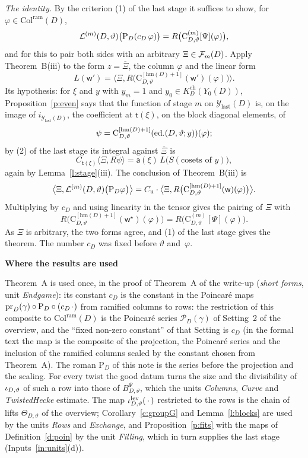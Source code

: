 \documentclass[11pt,a4paper]{article}
\makeatletter
\newcommand{\m}[1]{\mbox{$#1$}}        %
\newcommand{\sect}[2]{\refstepcounter{section}\label{#2}\par\addvspace{19pt plus 4pt minus 2pt}\Needspace{7\baselineskip}%
  \noindent\llap{{\fontsize{13.2}{16}\selectfont\bfseries\color{inkfaint}\thesection}\hspace{9pt}}%
  {\fontsize{13.2}{16}\selectfont\bfseries\color{ink}#1}\par\nopagebreak\vspace{-1pt}}
\theoremstyle{plainx}
\theoremstyle{uprightx}
\renewenvironment{proof}[1][Proof]{\par\pushQED{\qed}\normalfont\topsep0pt\partopsep0pt
  \trivlist\item[\hskip\labelsep\itshape #1.]\ignorespaces}{\popQED\endtrivlist\@endpefalse}
\newcommand{\cj}[1]{\overline{#1}}
\newcommand{\rhoD}[1]{\mathrm{hm}(#1)}                 %
\newcommand{\Ys}[2]{Y_{#2}(#1)}                    %
\newcommand{\Colram}[1]{\mathrm{Col}^{\mathrm{ram}}(#1)}
\newcommand{\PoinD}[1]{\mathrm{P}_{#1}}            %
\newcommand{\Bmu}[3]{B^{#3}_{#1,#2}}               %
\newcommand{\Kch}[2]{K^{\mathrm{ch}}_{#1}(#2)}     %
\newcommand{\chnn}[4]{\mathrm{C}^{[#4]}_{#1,#2}(#3)}       %
\newcommand{\chcomb}[4]{\mathrm{C}^{(#4)}_{#1,#2}[#3]}     %
\newcommand{\gYlast}{\mathcal{Y}_{\mathrm{last}}(D)}
\newcommand{\incl}[1]{i_{#1}}                      %
\newcommand{\cD}[1]{c_{#1}}                         %
\makeatother
\begin{document}
\begin{proof}[Proof of Theorem~A]
\emph{The identity.} By the criterion (1) of the last stage it suffices to show, for \m{\varphi\in\Colram{D}},
\[\chainY{\vartheta}{m}{\bigl(\PoinD{D}(\cD{D}\,\varphi)\bigr)}=R\bigl(\chcomb{D}{\vartheta}{\Psi}{m}(\varphi)\bigr),\]
and for this to pair both sides with an arbitrary \m{\Xi\in\FormY{m}}. Apply
Theorem~B(iii) to the form \m{z=\cj\Xi}, the column $\varphi$ and the linear form
\[L(\mathsf{w}')=\bigl\langle\Xi,R\bigl(\chnn{D}{\vartheta}{\mathsf{w}'}{\rhoD{D}+1}(\varphi)\bigr)\bigr\rangle .\]
Its hypothesis: for $\xi$ and $y$ with
\m{y_m=1} and \m{y_0\in\Kch{D}{\Ys{D}{0}}}, Proposition~\ref{p:even} says that the function of stage $m$ on $\gYlast$
is, on the image of \m{\incl{\gYlast}}, the coefficient at $\mathsf{t}(\xi)$, on the block diagonal elements, of
\[\psi=\chnn{D}{\vartheta}{\evD{\vartheta}{y}{\cdot}}{\rhoD{D}+1}(\varphi);\]
by (2) of the last stage its integral against \m{\cj\Xi} is
\[C_{\mathsf{t}(\xi)}\langle\Xi,R\psi\rangle=\mathsf{a}(\xi)\,L\bigl(S(\text{cosets of }y)\bigr),\]
again by Lemma~\ref{l:stage}(iii). The conclusion of Theorem~B(iii) is
\[\bigl\langle\Xi,\chainY{\vartheta}{m}{\bigl(\PoinD{D}\varphi\bigr)}\bigr\rangle=C_{\mathrm{u}}\cdot\bigl\langle\Xi,R\bigl(\chnn{D}{\vartheta}{\mathsf{w}}{\rhoD{D}+1}(\varphi)\bigr)\bigr\rangle .\]
Multiplying by $\cD{D}$ and using linearity in the tensor gives the pairing of $\Xi$ with
\[R\bigl(\chnn{D}{\vartheta}{\mathsf{w}^{\star}}{\rhoD{D}+1}(\varphi)\bigr)=R\bigl(\chcomb{D}{\vartheta}{\Psi}{m}(\varphi)\bigr).\]
As $\Xi$ is
arbitrary, the two forms agree, and (1) of the last stage gives the theorem. The number $\cD{D}$ was fixed before
$\vartheta$ and~$\varphi$.
\end{proof}

\sect{Where the results are used}{s:used}

Theorem~A is used once, in the proof of Theorem~A of the write-up (\emph{short forms}, unit \emph{Endgame}): its
constant $\cD{D}$ is the constant in the Poincar\'e maps \m{\gpt{D}{\gamma}\circ\PoinD{D}\circ(\cD{D}\,\cdot)} from
ramified columns to rows: the restriction of this composite to $\Colram{D}$ is the Poincar\'e series
$\mathcal{P}_D(\gamma)$ of Setting~2 of the overview, and the ``fixed non-zero constant'' of that Setting is
$\cD{D}$ (in the formal text the map is the composite of the projection, the Poincar\'e series and the inclusion
of the ramified columns scaled by the constant chosen from Theorem~A). The roman $\PoinD{D}$ of this note is the
series before the projection and the scaling. For every twist the good datum turns the size and the divisibility of
\m{\iot{\vartheta}} of such a row into those of \m{\Bmu{D}{\vartheta}{\Psi}}, which the units \emph{Columns},
\emph{Curve} and \emph{TwistedHecke} estimate. The map \m{\iotL{\vartheta}{(\,\cdot\,)}} restricted to the rows is
the chain of lifts $\Theta_{D,\vartheta}$ of the overview; Corollary~\ref{c:groupG} and Lemma~\ref{l:blocks} are used by
the units \emph{Rows} and \emph{Exchange}, and Proposition~\ref{p:fits} with the maps of Definition~\ref{d:poin} by
the unit \emph{Filling}, which in turn supplies the last stage (Inputs~\ref{in:units}(d)).
\end{document}
